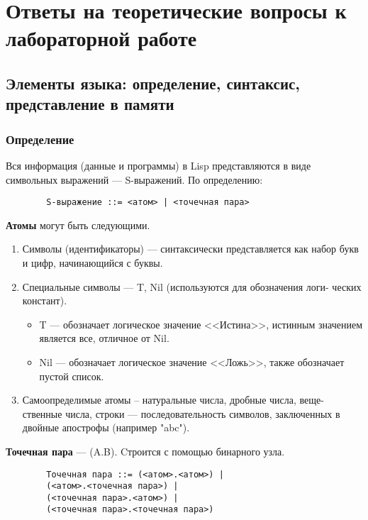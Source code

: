\chapter{Ответы на теоретические вопросы к лабораторной работе}

\section{Элементы языка: определение, синтаксис, представление в памяти}

\subsection{Определение}

Вся информация (данные и программы) в Lisp представляются в виде символьных выражений --- S-выражений. По определению:

\begin{center}
	\captionsetup{justification=raggedright,singlelinecheck=off}
	\begin{lstlisting}
		S-выражение ::= <атом> | <точечная пара>
	\end{lstlisting}
\end{center}	

\textbf{Атомы} могут быть следующими.

\begin{enumerate}[label={\arabic*)}]
	\item Символы (идентификаторы) --- синтаксически представляется как набор букв и цифр, начинающийся с буквы.
	\item Специальные символы --- T, Nil (используются для обозначения логи- ческих констант).
	\begin{itemize}[label*=--]
		\item T --- обозначает логическое значение <<Истина>>, истинным значением является все, отличное от Nil.
		\item Nil --- обозначает логическое значение <<Ложь>>, также обозначает пустой список.
	\end{itemize}
	\item Самоопределимые атомы -- натуральные числа, дробные числа, веще- ственные числа, строки --- последовательность символов, заключенных в двойные апострофы (например "abc").
\end{enumerate}

\textbf{Точечная пара} --- (A.B). Cтроится с помощью бинарного узла.

\begin{center}
	\captionsetup{justification=raggedright,singlelinecheck=off}
	\begin{lstlisting}
		Точечная пара ::= (<атом>.<атом>) | 
		(<атом>.<точечная пара>) |
		(<точечная пара>.<атом>) | 
		(<точечная пара>.<точечная пара>)
	\end{lstlisting}
\end{center}	

